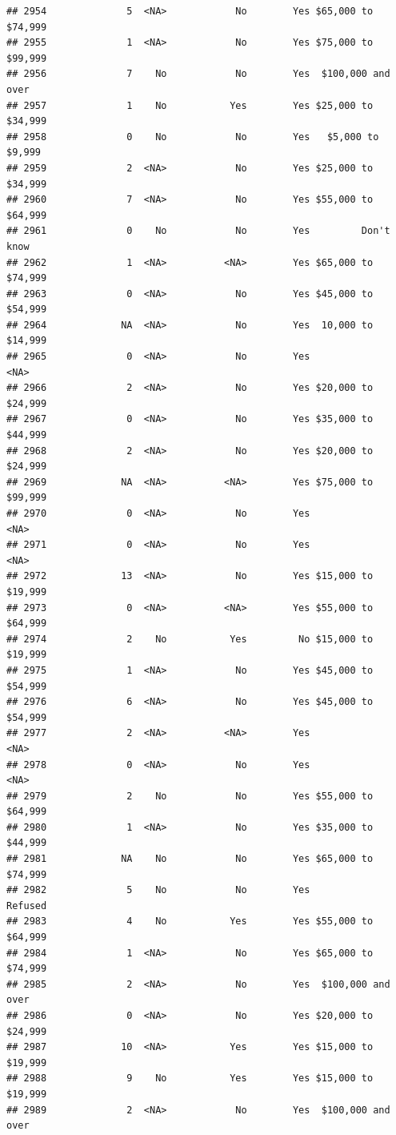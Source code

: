 \documentclass[man]{apa6}
\begin{document}
\begin{verbatim}
## 2954              5  <NA>            No        Yes $65,000 to $74,999
## 2955              1  <NA>            No        Yes $75,000 to $99,999
## 2956              7    No            No        Yes  $100,000 and over
## 2957              1    No           Yes        Yes $25,000 to $34,999
## 2958              0    No            No        Yes   $5,000 to $9,999
## 2959              2  <NA>            No        Yes $25,000 to $34,999
## 2960              7  <NA>            No        Yes $55,000 to $64,999
## 2961              0    No            No        Yes         Don't know
## 2962              1  <NA>          <NA>        Yes $65,000 to $74,999
## 2963              0  <NA>            No        Yes $45,000 to $54,999
## 2964             NA  <NA>            No        Yes  10,000 to $14,999
## 2965              0  <NA>            No        Yes               <NA>
## 2966              2  <NA>            No        Yes $20,000 to $24,999
## 2967              0  <NA>            No        Yes $35,000 to $44,999
## 2968              2  <NA>            No        Yes $20,000 to $24,999
## 2969             NA  <NA>          <NA>        Yes $75,000 to $99,999
## 2970              0  <NA>            No        Yes               <NA>
## 2971              0  <NA>            No        Yes               <NA>
## 2972             13  <NA>            No        Yes $15,000 to $19,999
## 2973              0  <NA>          <NA>        Yes $55,000 to $64,999
## 2974              2    No           Yes         No $15,000 to $19,999
## 2975              1  <NA>            No        Yes $45,000 to $54,999
## 2976              6  <NA>            No        Yes $45,000 to $54,999
## 2977              2  <NA>          <NA>        Yes               <NA>
## 2978              0  <NA>            No        Yes               <NA>
## 2979              2    No            No        Yes $55,000 to $64,999
## 2980              1  <NA>            No        Yes $35,000 to $44,999
## 2981             NA    No            No        Yes $65,000 to $74,999
## 2982              5    No            No        Yes            Refused
## 2983              4    No           Yes        Yes $55,000 to $64,999
## 2984              1  <NA>            No        Yes $65,000 to $74,999
## 2985              2  <NA>            No        Yes  $100,000 and over
## 2986              0  <NA>            No        Yes $20,000 to $24,999
## 2987             10  <NA>           Yes        Yes $15,000 to $19,999
## 2988              9    No           Yes        Yes $15,000 to $19,999
## 2989              2  <NA>            No        Yes  $100,000 and over

\end{verbatim}
\end{document}
